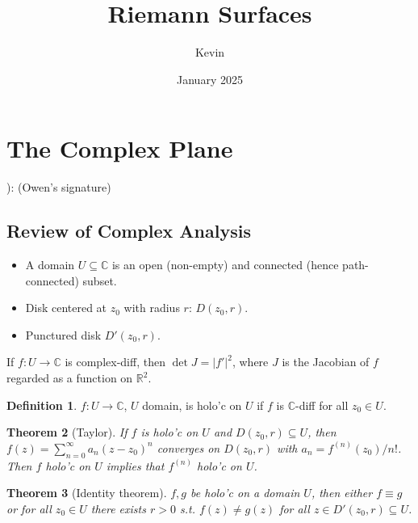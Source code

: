 \documentclass{article}
\title{Riemann Surfaces}
\author{Kevin}
\date{January 2025}
\theoremstyle{definition}
\newtheorem{defn}{Definition}[section]
\theoremstyle{remark}
\theoremstyle{plain}
\newtheorem{thm}[defn]{Theorem}
\newcommand{\RR}{\mathbb{R}}
\newcommand{\CC}{\mathbb{C}}
\begin{document}
\maketitle
\section{The Complex Plane}
): (Owen's signature)
\subsection{Review of Complex Analysis}
\begin{itemize}
    \item A domain $U\subseteq \CC$ is an open (non-empty) and connected (hence path-connected) subset. 
    \item Disk centered at $z_0$ with radius $r$: $D(z_0,r)$.
    \item Punctured disk $D'(z_0,r)$.
\end{itemize}
If $f:U\to\CC$ is complex-diff, then $\det J=|f'|^2$, where $J$ is the Jacobian of $f$ regarded as a function on $\RR^2$.
\begin{defn}
    $f:U\to\CC$, $U$ domain, is holo'c on $U$ if $f$ is $\CC$-diff for all $z_0\in U$.
\end{defn}
\begin{thm}[Taylor]
    If $f$ is holo'c on $U$ and $D(z_0,r)\subseteq U$, then $f(z)=\sum_{n=0}^\infty a_n(z-z_0)^n$ converges on $D(z_0,r)$ with $a_n=f^{(n)}(z_0)/n!$. Then $f$ holo'c on $U$ implies that $f^{(n)}$ holo'c on $U$.
\end{thm}
\begin{thm}[Identity theorem]
    $f,g$ be holo'c on a domain $U$, then either $f\equiv g$ or for all $z_0\in U$ there exists $r>0$ s.t. $f(z)\neq g(z)$ for all $z\in D'(z_0,r)\subseteq U$.
\end{thm}
\end{document}

